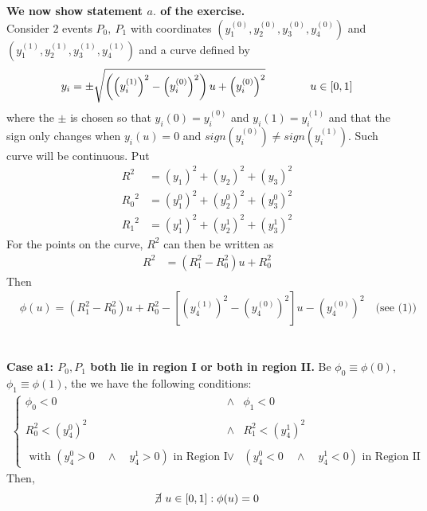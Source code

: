 \textbf{We now show statement $\mathit{a.}$ of the exercise.}\\
Consider $2$ events $P_0,\ P_1$ with coordinates $(y_1^{(0)},y_2^{(0)},y_3^{(0)},y_4^{(0)})$ and $(y_1^{(1)},y_2^{(1)},y_3^{(1)},y_4^{(1)})$  and a curve defined by 
\begin{align*}
y_i= \pm\sqrt{\left(\left(y_i^{(1)}\right)^2-\left(y_i^{(0)}\right)^2\right)u + \left(y_i^{(0)}\right)^2}\quad\quad\quad\quad u\in \left[0,1\right]
\end{align*}
where the $\pm$ is chosen so that $y_i(0) = y_i^{(0)}$ and $y_i(1) = y_i^{(1)}$ and that the sign only changes when $y_i(u)=0$ and $sign\left(y_i^{(0)}\right) \neq sign\left(y_i^{(1)}\right)$. Such curve will be continuous.
Put
\begin{align*}
R^2&= \left(y_1\right)^2+\left(y_2\right)^2+\left(y_3\right)^2\\
{R_{0}}^2&= \left(y^0_1\right)^2+\left(y^0_2\right)^2+\left(y^0_3\right)^2\\
{R_{1}}^2&= \left(y^1_1\right)^2+\left(y^1_2\right)^2+\left(y^1_3\right)^2
\end{align*}
For the points on the curve, $R^2$ can then be written as 
\begin{align*}
R^2&= \left(R_1^2-R_0^2\right)u+R_0^2
\end{align*}
Then \begin{align}
&\phi(u) = \left(R_1^2-R_0^2\right)u+R_0^2 - \left[\left(y_4^{(1)}\right)^2   -\left(y_4^{(0)}\right)^2 \right]u -\left(y_4^{(0)}\right)^2 \quad \text{(see (1))}
\end{align}\\\\
\textbf{Case a1: $P_0, P_1$ both lie in region I or both in region II.} Be $\phi_0\equiv \phi(0)$, $\phi_1\equiv \phi(1)$, the we have the following conditions:\\
\begin{align*}
\left\{\begin {matrix}
\phi_0 < 0&\wedge &\phi_1  < 0\\\\
R_0^2 < (y_4^{0})^2 &\wedge &  R_1^2 < (y_4^{1})^2 \\\\
\text{ with } (y_4^{0}>0 \quad  \wedge \quad y_4^{1}>0)\text{ in Region I} &\vee & (y_4^{0}<0\quad \wedge \quad y_4^{1}<0)  \text{ in Region II}
\end{matrix}\right.
\end{align*}
Then, $$\cancel{\exists } \  u \in \left[0,1\right]: \phi(u)=0$$

